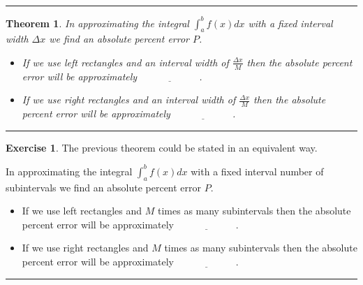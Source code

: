 \documentclass[
]{book}
\newtheorem{theorem}{Theorem}[chapter]
\theoremstyle{definition}
\theoremstyle{definition}
\theoremstyle{definition}
\newtheorem{exercise}{Exercise}[chapter]
\theoremstyle{remark}
\begin{document}
\begin{center}\rule{0.5\linewidth}{0.5pt}\end{center}

\begin{theorem}
\protect\hypertarget{thm:unnamed-chunk-175}{}{\label{thm:unnamed-chunk-175} }In approximating the integral \(\int_a^b f(x) dx\) with a fixed interval
width \(\Delta  x\) we find an absolute percent error \(P\).

\begin{itemize}
\item
  If we use left rectangles and an interval width of
  \(\frac{\Delta x}{M}\) then the absolute percent error will be
  approximately \(\underline{\hspace{1in}}\).
\item
  If we use right rectangles and an interval width of
  \(\frac{\Delta x}{M}\) then the absolute percent error will be
  approximately \(\underline{\hspace{1in}}\).
\end{itemize}
\end{theorem}

\begin{center}\rule{0.5\linewidth}{0.5pt}\end{center}

\begin{exercise}
\protect\hypertarget{exr:unnamed-chunk-176}{}{\label{exr:unnamed-chunk-176} }The previous theorem could be stated in an equivalent way.

In approximating the integral \(\int_a^b f(x) dx\) with a fixed interval
number of subintervals we find an absolute percent error \(P\).

\begin{itemize}
\item
  If we use left rectangles and \(M\) times as many subintervals then
  the absolute percent error will be approximately \(\underline{\hspace{1in}}\).
\item
  If we use right rectangles and \(M\) times as many subintervals then
  the absolute percent error will be approximately \(\underline{\hspace{1in}}\).
\end{itemize}
\end{exercise}

\begin{center}\rule{0.5\linewidth}{0.5pt}\end{center}
\end{document}
